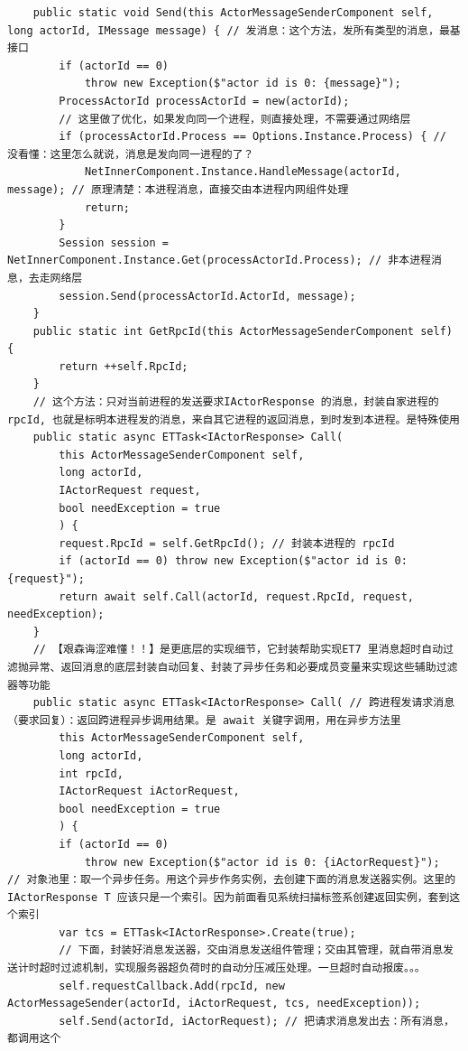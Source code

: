 \documentclass[9pt, b5paper]{article}
\begin{document}
\begin{itemize}
\begin{verbatim}
    public static void Send(this ActorMessageSenderComponent self, long actorId, IMessage message) { // 发消息：这个方法，发所有类型的消息，最基接口
        if (actorId == 0) 
            throw new Exception($"actor id is 0: {message}");
        ProcessActorId processActorId = new(actorId);
        // 这里做了优化，如果发向同一个进程，则直接处理，不需要通过网络层
        if (processActorId.Process == Options.Instance.Process) { // 没看懂：这里怎么就说，消息是发向同一进程的了？
            NetInnerComponent.Instance.HandleMessage(actorId, message); // 原理清楚：本进程消息，直接交由本进程内网组件处理
            return;
        }
        Session session = NetInnerComponent.Instance.Get(processActorId.Process); // 非本进程消息，去走网络层
        session.Send(processActorId.ActorId, message);
    }
    public static int GetRpcId(this ActorMessageSenderComponent self) {
        return ++self.RpcId;
    }
    // 这个方法：只对当前进程的发送要求IActorResponse 的消息，封装自家进程的 rpcId, 也就是标明本进程发的消息，来自其它进程的返回消息，到时发到本进程。是特殊使用
    public static async ETTask<IActorResponse> Call(
        this ActorMessageSenderComponent self,
        long actorId,
        IActorRequest request,
        bool needException = true
        ) {
        request.RpcId = self.GetRpcId(); // 封装本进程的 rpcId 
        if (actorId == 0) throw new Exception($"actor id is 0: {request}");
        return await self.Call(actorId, request.RpcId, request, needException);
    }
    // 【艰森诲涩难懂！！】是更底层的实现细节，它封装帮助实现ET7 里消息超时自动过滤抛异常、返回消息的底层封装自动回复、封装了异步任务和必要成员变量来实现这些辅助过滤器等功能 
    public static async ETTask<IActorResponse> Call( // 跨进程发请求消息（要求回复）：返回跨进程异步调用结果。是 await 关键字调用，用在异步方法里
        this ActorMessageSenderComponent self,
        long actorId,
        int rpcId,
        IActorRequest iActorRequest,
        bool needException = true
        ) {
        if (actorId == 0) 
            throw new Exception($"actor id is 0: {iActorRequest}");
// 对象池里：取一个异步任务。用这个异步作务实例，去创建下面的消息发送器实例。这里的 IActorResponse T 应该只是一个索引。因为前面看见系统扫描标签系创建返回实例，套到这个索引
        var tcs = ETTask<IActorResponse>.Create(true);
        // 下面，封装好消息发送器，交由消息发送组件管理；交由其管理，就自带消息发送计时超时过滤机制，实现服务器超负荷时的自动分压减压处理。一旦超时自动报废。。。
        self.requestCallback.Add(rpcId, new ActorMessageSender(actorId, iActorRequest, tcs, needException)); 
        self.Send(actorId, iActorRequest); // 把请求消息发出去：所有消息，都调用这个 

\end{verbatim}
\end{itemize}
\end{document}
